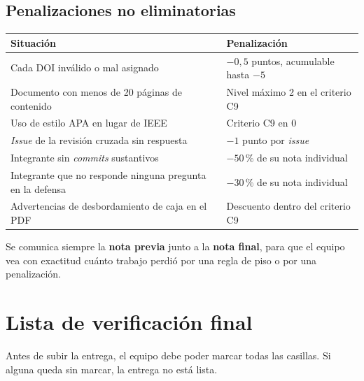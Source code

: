 \documentclass[11pt,a4paper]{article}
\begin{document}
	\subsection{Penalizaciones no eliminatorias}
	
	\begin{center}
		\small
		\begin{tabular}{@{}p{9.6cm}p{5.0cm}@{}}
			\toprule
			\textbf{Situación} & \textbf{Penalización} \\
			\midrule
			Cada DOI inválido o mal asignado & $-0{,}5$ puntos, acumulable hasta $-5$ \\
			Documento con menos de 20 páginas de contenido & Nivel máximo 2 en el criterio C9 \\
			Uso de estilo APA en lugar de IEEE & Criterio C9 en 0 \\
			\emph{Issue} de la revisión cruzada sin respuesta & $-1$ punto por \emph{issue} \\
			Integrante sin \emph{commits} sustantivos & $-50\,\%$ de su nota individual \\
			Integrante que no responde ninguna pregunta en la defensa & $-30\,\%$ de su nota individual \\
			Advertencias de desbordamiento de caja en el PDF & Descuento dentro del criterio C9 \\
			\bottomrule
		\end{tabular}
	\end{center}
	
	Se comunica siempre la \textbf{nota previa} junto a la \textbf{nota final}, para que el equipo vea con exactitud cuánto trabajo perdió por una regla de piso o por una penalización.
	
	\section{Lista de verificación final}
	
	Antes de subir la entrega, el equipo debe poder marcar todas las casillas. Si alguna queda sin marcar, la entrega no está lista.
	
\end{document}
